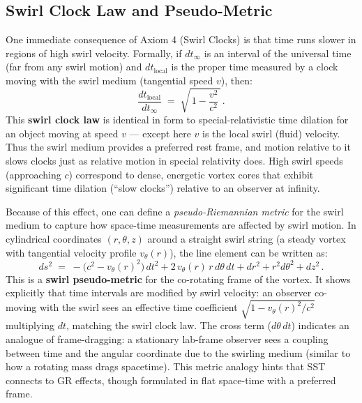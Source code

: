 \documentclass[reprint,aps,onecolumn,nofootinbib]{revtex4-2}
\begin{document}
	\subsection*{Swirl Clock Law and Pseudo-Metric}
	One immediate consequence of Axiom 4 (Swirl Clocks) is that time runs slower in regions of high swirl velocity. Formally, if $dt_{\infty}$ is an interval of the universal time (far from any swirl motion) and $dt_{\text{local}}$ is the proper time measured by a clock moving with the swirl medium (tangential speed $v$), then:
	\[
		\frac{dt_{\text{local}}}{dt_{\infty}} \;=\; \sqrt{\,1 - \frac{v^2}{c^2}\,}\,.
	\]
	This \textbf{swirl clock law} is identical in form to special-relativistic time dilation for an object moving at speed $v$ — except here $v$ is the local swirl (fluid) velocity. Thus the swirl medium provides a preferred rest frame, and motion relative to it slows clocks just as relative motion in special relativity does. High swirl speeds (approaching $c$) correspond to dense, energetic vortex cores that exhibit significant time dilation (“slow clocks”) relative to an observer at infinity.

	Because of this effect, one can define a \emph{pseudo-Riemannian metric} for the swirl medium to capture how space-time measurements are affected by swirl motion. In cylindrical coordinates $(r,\theta,z)$ around a straight swirl string (a steady vortex with tangential velocity profile $v_{\theta}(r)$), the line element can be written as:
	\[
		ds^2 \;=\; -\big(c^2 - v_{\theta}(r)^2\big)\,dt^2 + 2\,v_{\theta}(r)\,r\,d\theta\,dt + dr^2 + r^2 d\theta^2 + dz^2\,.
	\]
	This is a \textbf{swirl pseudo-metric} for the co-rotating frame of the vortex. It shows explicitly that time intervals are modified by swirl velocity: an observer co-moving with the swirl sees an effective time coefficient $\sqrt{1 - v_{\theta}(r)^2/c^2}$ multiplying $dt$, matching the swirl clock law. The cross term ($d\theta\,dt$) indicates an analogue of frame-dragging: a stationary lab-frame observer sees a coupling between time and the angular coordinate due to the swirling medium (similar to how a rotating mass drags spacetime). This metric analogy hints that SST connects to GR effects, though formulated in flat space-time with a preferred frame.

\end{document}
